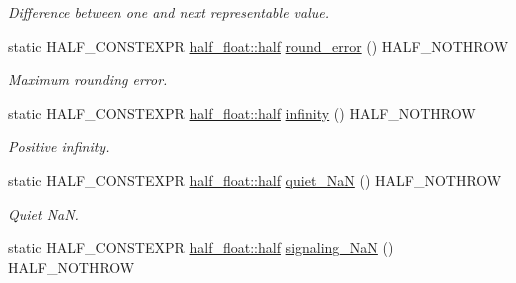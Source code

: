 \begin{DoxyCompactItemize}
\begin{DoxyCompactList}\small\item\em Difference between one and next representable value. \end{DoxyCompactList}\item 
static H\+A\+L\+F\+\_\+\+C\+O\+N\+S\+T\+E\+X\+PR \hyperlink{classhalf__float_1_1half}{half\+\_\+float\+::half} \hyperlink{classstd_1_1numeric__limits_3_01half__float_1_1half_01_4_a93220b59e5afbdb473c87f7046a95b06}{round\+\_\+error} () H\+A\+L\+F\+\_\+\+N\+O\+T\+H\+R\+OW\hypertarget{classstd_1_1numeric__limits_3_01half__float_1_1half_01_4_a93220b59e5afbdb473c87f7046a95b06}{}\label{classstd_1_1numeric__limits_3_01half__float_1_1half_01_4_a93220b59e5afbdb473c87f7046a95b06}

\begin{DoxyCompactList}\small\item\em Maximum rounding error. \end{DoxyCompactList}\item 
static H\+A\+L\+F\+\_\+\+C\+O\+N\+S\+T\+E\+X\+PR \hyperlink{classhalf__float_1_1half}{half\+\_\+float\+::half} \hyperlink{classstd_1_1numeric__limits_3_01half__float_1_1half_01_4_aafcca31b982e48b928c1e6cc318f6e6f}{infinity} () H\+A\+L\+F\+\_\+\+N\+O\+T\+H\+R\+OW\hypertarget{classstd_1_1numeric__limits_3_01half__float_1_1half_01_4_aafcca31b982e48b928c1e6cc318f6e6f}{}\label{classstd_1_1numeric__limits_3_01half__float_1_1half_01_4_aafcca31b982e48b928c1e6cc318f6e6f}

\begin{DoxyCompactList}\small\item\em Positive infinity. \end{DoxyCompactList}\item 
static H\+A\+L\+F\+\_\+\+C\+O\+N\+S\+T\+E\+X\+PR \hyperlink{classhalf__float_1_1half}{half\+\_\+float\+::half} \hyperlink{classstd_1_1numeric__limits_3_01half__float_1_1half_01_4_a4583df9bd2b496cb47e7c0fa7d1fe7eb}{quiet\+\_\+\+NaN} () H\+A\+L\+F\+\_\+\+N\+O\+T\+H\+R\+OW\hypertarget{classstd_1_1numeric__limits_3_01half__float_1_1half_01_4_a4583df9bd2b496cb47e7c0fa7d1fe7eb}{}\label{classstd_1_1numeric__limits_3_01half__float_1_1half_01_4_a4583df9bd2b496cb47e7c0fa7d1fe7eb}

\begin{DoxyCompactList}\small\item\em Quiet NaN. \end{DoxyCompactList}\item 
static H\+A\+L\+F\+\_\+\+C\+O\+N\+S\+T\+E\+X\+PR \hyperlink{classhalf__float_1_1half}{half\+\_\+float\+::half} \hyperlink{classstd_1_1numeric__limits_3_01half__float_1_1half_01_4_ae0451fbc23a2d62bfd9f6bbf7956b4f3}{signaling\+\_\+\+NaN} () H\+A\+L\+F\+\_\+\+N\+O\+T\+H\+R\+OW\hypertarget{classstd_1_1numeric__limits_3_01half__float_1_1half_01_4_ae0451fbc23a2d62bfd9f6bbf7956b4f3}{}\label{classstd_1_1numeric__limits_3_01half__float_1_1half_01_4_ae0451fbc23a2d62bfd9f6bbf7956b4f3}


\end{DoxyCompactItemize}
